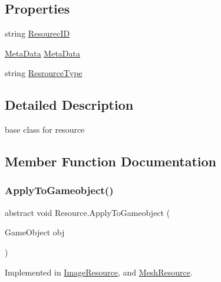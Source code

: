 \subsection*{Properties}
\begin{DoxyCompactItemize}
\item 
string \mbox{\hyperlink{class_resource_a7d8b0fc1f53ddeb34007b3ca3a8cda21}{Resourec\+ID}}
\item 
\mbox{\hyperlink{class_meta_data}{Meta\+Data}} \mbox{\hyperlink{class_resource_a081e2bc38733abfd0da66f18029a5555}{Meta\+Data}}
\item 
string \mbox{\hyperlink{class_resource_adaaa8f2b95e5b1dd4268d4bbdc05124d}{Resrource\+Type}}
\end{DoxyCompactItemize}


\subsection{Detailed Description}
base class for resource 



\subsection{Member Function Documentation}
\mbox{\label{class_resource_a2461ea96169926a858f02ebaf94157fb}} 
\subsubsection{\texorpdfstring{Apply\+To\+Gameobject()}{ApplyToGameobject()}}
{\footnotesize\ttfamily abstract void Resource.\+Apply\+To\+Gameobject (\begin{DoxyParamCaption}\item[{Game\+Object}]{obj }\end{DoxyParamCaption})\hspace{0.3cm}{\ttfamily [pure virtual]}}



Implemented in \mbox{\hyperlink{class_image_resource_a98a60534e3c84e19caaf327732126d00}{Image\+Resource}}, and \mbox{\hyperlink{class_mesh_resource_af15a1d1060432e07a256bd3fa54d9b1c}{Mesh\+Resource}}.

